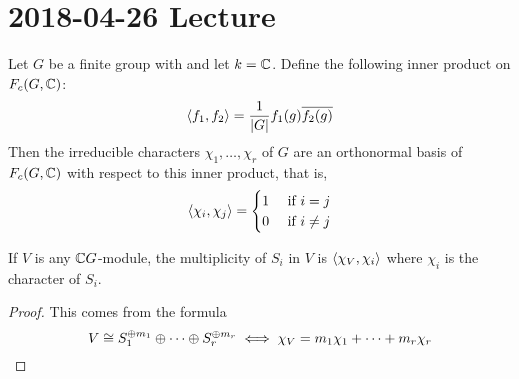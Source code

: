 \section{2018-04-26 Lecture}

\begin{thm}
  Let $G$ be a finite group with and let $k=\mathbb{C}$.
  Define the following inner product on $F_c(G,\mathbb{C})$:
  \[{\left\langle f_1,f_2 \right\rangle} = \frac{1}{\left\lvert G \right\rvert}f_1(g) \overline{f_2(g)}\]
  Then the irreducible characters $\chi_1,\ldots,\chi_r$ of $G$ are an orthonormal basis of $F_c(G,\mathbb{C})$ with respect to this inner product, that is,
  \begin{equation*}
    {\left\langle \chi_i,\chi_j \right\rangle}=
    \begin{cases}
      1 & \text{ if } i=j \\
      0 & \text{ if } i \neq j
    \end{cases}
  \end{equation*}
\end{thm}

\begin{cor}
  If $V$ is any $\mathbb{C} G$-module, the multiplicity of $S_i$ in $V$ is ${\left\langle \chi_V,\chi_i \right\rangle}$ where $\chi_i$ is the character of $S_i$.
\end{cor}

\begin{proof}
  This comes from the formula
  \[V \cong S_1^{\oplus m_1} \oplus \cdots \oplus S_r^{\oplus m_r} \iff \chi_V = m_1\chi_1 + \cdots + m_r\chi_r \qedhere\]
\end{proof}

